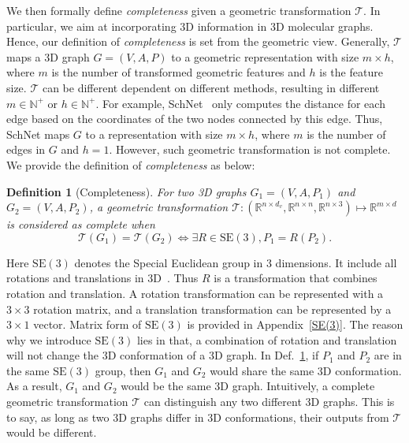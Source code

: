 \documentclass{article}
\newtheorem{definition}{Definition}
\begin{document}
We then formally define \emph{completeness} given a geometric transformation $\mathcal{T}$.
In particular, we aim at incorporating 3D information in 3D molecular graphs. Hence,
our definition of \emph{completeness} is set from the geometric view.
Generally, $\mathcal{T}$ maps a 3D graph $G=(V,A,P)$ to a geometric representation with size $m\times h$\textcolor{COLOR}{, where $m$ is the number of transformed geometric features and $h$ is the feature size}. 
$\mathcal{T}$ can be different dependent on different methods, resulting in different $m \in\mathbb{N}^+$ or
$h \in\mathbb{N}^+$.
For example, SchNet~\citep{schutt2017schnet} \textcolor{COLOR}{only computes the distance for each edge based on the coordinates of the two nodes connected by this edge.}
Thus, SchNet maps $G$ to a representation with size $m\times h$,
where $m$ is the number of edges in $G$ and $h=1$.
However, such geometric transformation is not complete.
We provide the definition of \emph{completeness} as below:

\begin{definition}[Completeness]
For two 3D graphs $G_1=(V, A, P_1)$ and $G_2=(V, A, P_2)$,
a geometric transformation $\mathcal{T}:(\mathbb{R}^{n\times d_v}, \mathbb{R}^{n\times n}, \mathbb{R}^{n\times 3}) \mapsto \mathbb{R}^{m\times d}$ is considered as complete when
\begin{equation*}
\mathcal{T}(G_1) = \mathcal{T}(G_2) \iff \exists R \in \mathrm{SE(3)}, P_1 = R(P_2).
\end{equation*}
\label{def: gt}
\end{definition}
\vspace{-20pt}
\textcolor{COLOR}{Here $\mathrm{SE(3)}$ denotes the Special Euclidean group in 3 dimensions. It include all rotations and translations in 3D~\citep{adams2022learning, hoogeboom2022equivariant,liu2022spherical, satorras2021n}. Thus $R$ is a transformation that combines rotation and translation. A rotation transformation can be represented with a $3 \times 3$ rotation matrix, and a translation transformation can be represented by a $3 \times 1$ vector. Matrix form of $\mathrm{SE(3)}$ is provided in Appendix~\ref{SE(3)}.
The reason why we introduce $\mathrm{SE(3)}$ lies in that, a combination of rotation and translation will not change the 3D conformation of a 3D graph.
In Def.~\ref{def: gt}, if $P_1$ and $P_2$ are in the same $\mathrm{SE(3)}$ group, then $G_1$ and $G_2$ would share the same 3D conformation.
As a result, $G_1$ and $G_2$ would be the same 3D graph.}
Intuitively, a complete geometric transformation $\mathcal{T}$ can distinguish any two different 3D graphs.
This is to say, as long as two 3D graphs differ in \textcolor{COLOR}{3D conformations}, their outputs from $\mathcal{T}$ would be different.
\end{document}
